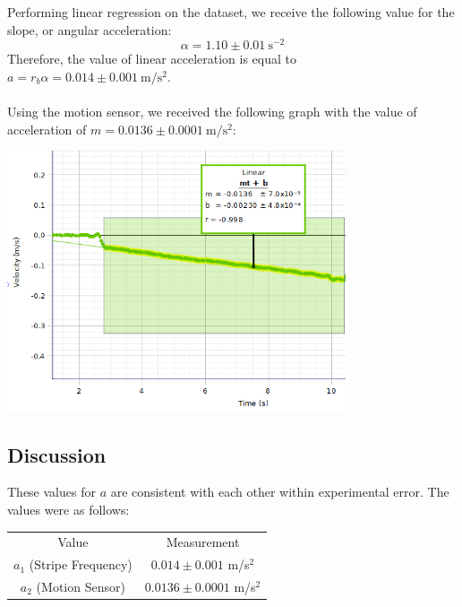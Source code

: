 \documentclass[9pt]{extarticle}
\newcommand{\plain}[1]{\textrm{#1}}
\begin{document}
{\begin{center}
\end{center}
Performing linear regression on the dataset, we receive the following value for the slope, or angular acceleration:
\[\alpha = 1.10\pm 0.01~\plain{s$^{-2}$}\]
Therefore, the value of linear acceleration is equal to $a = r_{b}\alpha = 0.014\pm 0.001~\plain{m/s$^2$}$.\\
\\
Using the motion sensor, we received the following graph with the value of acceleration of $m = 0.0136\pm 0.0001~\plain{m/s$^2$}$:
\begin{center}
	\includegraphics[width=10cm]{Lab8Image4_1}
\end{center}
\subsection*{Discussion}
These values for $a$ are consistent with each other within experimental error. The values were as follows:
\begin{center}
	\renewcommand{\arraystretch}{1.5}
	\begin{tabular}{c|c}
		Value & Measurement \\
		$a_1$ (Stripe Frequency) & $0.014\pm 0.001$ m/s$^2$ \\
		$a_2$ (Motion Sensor) & $0.0136\pm 0.0001$ m/s$^2$
	\end{tabular}
\end{center}
}
\end{document}
